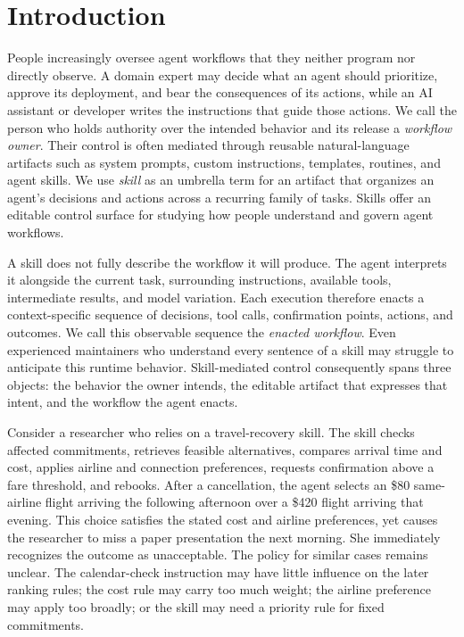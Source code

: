 \section{Introduction}
\label{sec:introduction}

People increasingly oversee agent workflows that they neither program nor directly observe. A domain expert may decide what an agent should prioritize, approve its deployment, and bear the consequences of its actions, while an AI assistant or developer writes the instructions that guide those actions. We call the person who holds authority over the intended behavior and its release a \emph{workflow owner}. Their control is often mediated through reusable natural-language artifacts such as system prompts, custom instructions, templates, routines, and agent skills. We use \emph{skill} as an umbrella term for an artifact that organizes an agent's decisions and actions across a recurring family of tasks. Skills offer an editable control surface for studying how people understand and govern agent workflows.

A skill does not fully describe the workflow it will produce. The agent interprets it alongside the current task, surrounding instructions, available tools, intermediate results, and model variation. Each execution therefore enacts a context-specific sequence of decisions, tool calls, confirmation points, actions, and outcomes. We call this observable sequence the \emph{enacted workflow}. Even experienced maintainers who understand every sentence of a skill may struggle to anticipate this runtime behavior. Skill-mediated control consequently spans three objects: the behavior the owner intends, the editable artifact that expresses that intent, and the workflow the agent enacts.

Consider a researcher who relies on a travel-recovery skill. The skill checks affected commitments, retrieves feasible alternatives, compares arrival time and cost, applies airline and connection preferences, requests confirmation above a fare threshold, and rebooks. After a cancellation, the agent selects an \$80 same-airline flight arriving the following afternoon over a \$420 flight arriving that evening. This choice satisfies the stated cost and airline preferences, yet causes the researcher to miss a paper presentation the next morning. She immediately recognizes the outcome as unacceptable. The policy for similar cases remains unclear. The calendar-check instruction may have little influence on the later ranking rules; the cost rule may carry too much weight; the airline preference may apply too broadly; or the skill may need a priority rule for fixed commitments.

